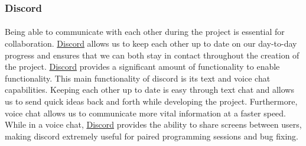 \documentclass[12pt]{article}
\begin{document}
\subsubsection{Discord}
\paragraph{}
	Being able to communicate with each other during the project is essential for collaboration. \href{https://discordapp.com/}{Discord} allows us to keep each other up to date on our day-to-day progress and ensures that we can both stay in contact throughout the creation of the project. \href{https://discordapp.com/}{Discord} provides a significant amount of functionality to enable functionality. This main functionality of discord is its text and voice chat capabilities. Keeping each other up to date is easy through text chat and allows us to send quick ideas back and forth while developing the project. Furthermore, voice chat allows us to communicate more vital information at a faster speed. While in a voice chat, \href{https://discordapp.com/}{Discord} provides the ability to share screens between users, making discord extremely useful for paired programming sessions and bug fixing.

	
\end{document}
